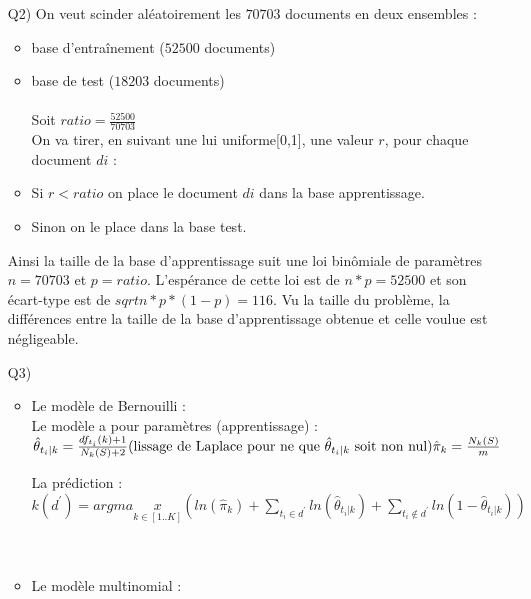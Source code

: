 \documentclass[a4paper, 12pt]{article}
\begin{document}
\begin{enumerate}
\item[Q2)] 
On veut scinder aléatoirement les $70703$ documents en deux ensembles :
\begin{itemize}
\item base d'entraînement ($52500$ documents) 
\item base de test ($18203$ documents)
\\
\\
Soit $ratio = \frac{52500}{70703}$ \\
On va tirer, en suivant une lui uniforme[0,1], une valeur $r$, pour chaque document $di$ :
\item Si $r<ratio$ on place le document $di$ dans la base apprentissage.
\item Sinon on le place dans la base test.
\end{itemize}
Ainsi la taille de la base d'apprentissage suit une loi binômiale de paramètres $n=70703$ et $p=ratio$. L'espérance de cette loi est de $n*p=52500$ et son écart-type est de $sqrt{n*p*(1-p)}=116$.
Vu la taille du problème, la différences entre la taille de la base d'apprentissage obtenue et celle voulue est négligeable.

\item[Q3)]
\begin{itemize}

\item Le modèle de Bernouilli : \\ 

Le modèle a pour paramètres (apprentissage) :\\
\begin{math}
   \hat{\theta}_{t_{i}|k}=\frac{df_{t_{i}}(k)+1}{N_{k}(S)+2} $(lissage de Laplace pour ne que $\hat{\theta}_{t_{i}|k} $ soit non nul)$\\
   \hat{\pi}_{k} = \frac{N_{k}(S)}{m}
\end{math}

La prédiction :\\
\begin{math}
   k(d^{'})=argmax\limits_{ k \in [1..K] } ( ln( \hat{\pi}_{k} ) + \sum\limits_{ t_{i} \in d^{'} } { ln(\hat{\theta}_{t_{i}|k}) } + \sum\limits_{ t_{i} \notin d^{'} } { ln(1- \hat{\theta}_{ t_{i} | k } )  } )
\end{math}
\\
\\
\\
\item Le modèle multinomial : \\  


\end{itemize}
\end{enumerate}
\end{document}
